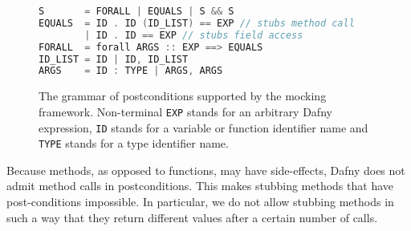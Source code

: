 \documentclass[runningheads]{llncs}
\begin{document}
\begin{figure}[h]
\begin{lstlisting}[language=c,basicstyle=\ttfamily\footnotesize]
S       = FORALL | EQUALS | S && S
EQUALS  = ID . ID (ID_LIST) == EXP // stubs method call
        | ID . ID == EXP // stubs field access
FORALL  = forall ARGS :: EXP ==> EQUALS
ID_LIST = ID | ID, ID_LIST
ARGS    = ID : TYPE | ARGS, ARGS
\end{lstlisting}
\caption{The grammar of postconditions supported by the mocking framework. Non-terminal \texttt{EXP} stands for an arbitrary Dafny expression, \texttt{ID} stands for a variable or function identifier name and \texttt{TYPE} stands for a type identifier name.}
\label{grammar}
\end{figure}

Because methods, as opposed to functions, may have side-effects, Dafny does not admit method calls in postconditions. 
This makes stubbing methods that have post-conditions impossible.
In particular, we do not allow stubbing methods in such a way that they return different values after a certain number of calls. 
\end{document}
